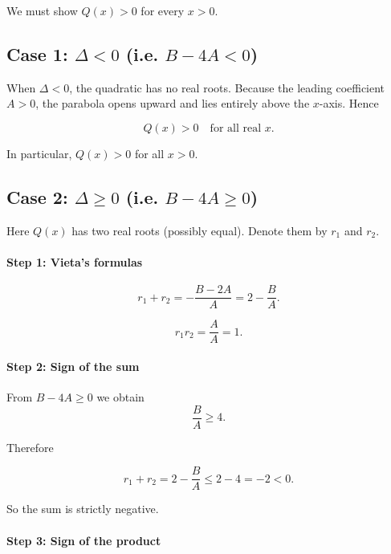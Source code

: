 \documentclass{article}
\begin{document}
We must show \(Q(x) > 0\) for every \(x > 0\).

\subsection*{Case 1: \(\Delta < 0\) (i.e. \(B-4A < 0\))}

When \(\Delta < 0\), the quadratic has no real roots. Because the leading coefficient \(A > 0\), the parabola opens upward and lies entirely above the \(x\)-axis. Hence

\begin{equation}
Q(x) > 0
\quad \text{for all real } x.
\tag{17}
\end{equation}

In particular, \(Q(x) > 0\) for all \(x > 0\).

\subsection*{Case 2: \(\Delta \ge 0\) (i.e. \(B-4A \ge 0\))}

Here \(Q(x)\) has two real roots (possibly equal). Denote them by \(r_1\) and \(r_2\).

\paragraph{Step 1: Vieta's formulas}

\begin{equation}
r_1 + r_2
=
-\frac{B-2A}{A}
=
2-\frac{B}{A}.
\tag{18}
\end{equation}

\begin{equation}
r_1r_2=\frac{A}{A}=1.
\tag{19}
\end{equation}

\paragraph{Step 2: Sign of the sum}

From \(B-4A \ge 0\) we obtain
\[
\frac{B}{A}\ge4.
\]

Therefore

\begin{equation}
r_1+r_2
=
2-\frac{B}{A}
\le
2-4
=
-2<0.
\tag{20}
\end{equation}

So the sum is strictly negative.

\paragraph{Step 3: Sign of the product}
\end{document}
